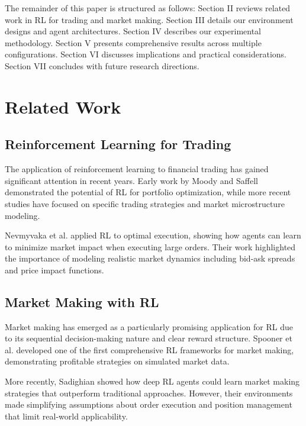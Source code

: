 \documentclass[conference]{IEEEtran}
\begin{document}
The remainder of this paper is structured as follows: Section II reviews related work in RL for trading and market making. Section III details our environment designs and agent architectures. Section IV describes our experimental methodology. Section V presents comprehensive results across multiple configurations. Section VI discusses implications and practical considerations. Section VII concludes with future research directions.



\section{Related Work}

\subsection{Reinforcement Learning for Trading}

The application of reinforcement learning to financial trading has gained significant attention in recent years. Early work by Moody and Saffell \cite{moody2001learning} demonstrated the potential of RL for portfolio optimization, while more recent studies have focused on specific trading strategies and market microstructure modeling.

Nevmyvaka et al. \cite{nevmyvaka2006reinforcement} applied RL to optimal execution, showing how agents can learn to minimize market impact when executing large orders. Their work highlighted the importance of modeling realistic market dynamics including bid-ask spreads and price impact functions.

\subsection{Market Making with RL}

Market making has emerged as a particularly promising application for RL due to its sequential decision-making nature and clear reward structure. Spooner et al. \cite{spooner2018market} developed one of the first comprehensive RL frameworks for market making, demonstrating profitable strategies on simulated market data.

More recently, Sadighian \cite{sadighian2019deep} showed how deep RL agents could learn market making strategies that outperform traditional approaches. However, their environments made simplifying assumptions about order execution and position management that limit real-world applicability.
\end{document}
